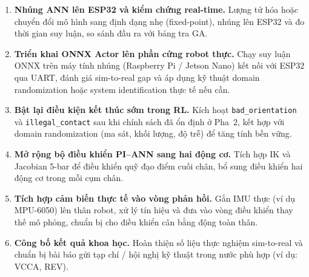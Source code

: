 \begin{enumerate}[leftmargin=1.5cm, label=\arabic*.]
    \item \textbf{Nhúng ANN lên ESP32 và kiểm chứng real-time.}
    Lượng tử hóa hoặc chuyển đổi mô hình sang định dạng nhẹ (fixed-point),
    nhúng lên ESP32 và đo thời gian suy luận, so sánh đầu ra với bảng tra GA.

    \item \textbf{Triển khai ONNX Actor lên phần cứng robot thực.}
    Chạy suy luận ONNX trên máy tính nhúng (Raspberry Pi / Jetson Nano) kết
    nối với ESP32 qua UART, đánh giá sim-to-real gap và áp dụng kỹ thuật
    domain randomization hoặc system identification thực tế nếu cần.

    \item \textbf{Bật lại điều kiện kết thúc sớm trong RL.}
    Kích hoạt \texttt{bad\_orientation} và \texttt{illegal\_contact} sau khi
    chính sách đã ổn định ở Pha~2, kết hợp với domain randomization
    (ma sát, khối lượng, độ trễ) để tăng tính bền vững.

    \item \textbf{Mở rộng bộ điều khiển PI--ANN sang hai động cơ.}
    Tích hợp IK và Jacobian 5-bar để điều khiển quỹ đạo điểm cuối chân,
    bổ sung điều khiển hai động cơ trong mỗi cụm chân.

    \item \textbf{Tích hợp cảm biến thực tế vào vòng phản hồi.}
    Gắn IMU thực (ví dụ MPU-6050) lên thân robot, xử lý tín hiệu và đưa
    vào vòng điều khiển thay thế mô phỏng, chuẩn bị cho điều khiển cân bằng
    động toàn thân.

    \item \textbf{Công bố kết quả khoa học.}
    Hoàn thiện số liệu thực nghiệm sim-to-real và chuẩn bị bài báo gửi
    tạp chí / hội nghị kỹ thuật trong nước phù hợp (ví dụ: VCCA, REV).
\end{enumerate}
